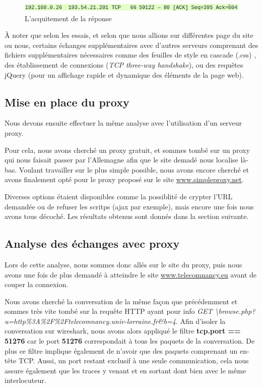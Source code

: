 \documentclass[12 pt,a4paper,frenchb]{article}
\begin{document}
\begin{figure}[h]
  \centering
  \includegraphics{Q1/acquittement_final.png}
  \caption{L'acquitement de la réponse}
\end{figure}
\vspace{1cm}

À noter que selon les essais, et selon que nous allions sur différentes page du site ou nous, certains échanges supplémentaires avec d'autres serveurs comprenant des fichiers supplémentaires nécessaires comme des feuilles de style en cascade (.css) , des établissement de connexions (\textit{TCP three-way handshake}), ou des requêtes jQuery (pour un affichage rapide et dynamique des éléments de la page web).


\subsection{Mise en place du proxy}

Nous devons ensuite effectuer la même analyse avec l'utilisation d'un serveur proxy.

Pour cela, nous avons cherché un proxy gratuit, et sommes tombé sur un proxy qui nous faisait passer par l'Allemagne afin que le site demadé nous localise là-bas. Voulant travailler sur le plus simple possible, nous avons encore cherché et avons finalement opté pour le proxy proposé sur le site \url{www.simpleproxy.net}.

Diverses options étaient disponibles comme la possiblité de crypter l'URL demandée ou de refuser les scritps (ajax par exemple), mais encore une fois nous avons tous décoché. Les résultats obtenus sont donnés dans la section suivante.

\subsection{Analyse des échanges avec proxy}

Lors de cette analyse, nous sommes donc allés sur le site du proxy, puis nous avons une fois de plus demandé à atteindre le site \url{www.telecomnancy.eu} avant de couper la connexion.

Nous avons cherché la conversation de la même façon que précédemment et sommes très vite tombé sur la requête HTTP ayant pour info  \textit{GET \textbackslash browse.php?u=http\%3A\%2F\%2Ftelecomnancy.univ-lorraine.fr\&b=4}. Afin d'isoler la conversation sur wireshark, nous avons alors appliqué le filtre \textbf{tcp.port == 51276} car le port \textbf{51276} correspondait à tous les paquets de la conversation. De plus ce filtre implique également de n'avoir que des paquets comprenant un en-tête TCP. Aussi, un port restant exclusif à une seule communication, cela nous assure également que les traces y venant et en sortant dont bien avec le même interlocuteur.
\end{document}
